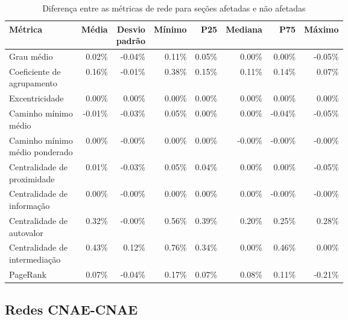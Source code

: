 \begin{table}[htb]
\centering
\caption{Diferença entre as métricas de rede para seções afetadas e não afetadas}
\label{tab:metricas-redes-pandemia:diferenca-afetadas-por-secao}
\begin{tabular}{l|rrrrrrr}
\toprule
Métrica & Média & \shortstack{Desvio\\padrão} & Mínimo & P25 & Mediana & P75 & Máximo \\
\midrule
Grau médio                     &  0.02\% & -0.04\% & 0.11\% & 0.05\% &  0.00\% &  0.00\% & -0.05\% \\ \hline
\shortstack[l]{Coeficiente de\\agrupamento}     &  0.16\% & -0.01\% & 0.38\% & 0.15\% &  0.11\% &  0.14\% &  0.07\% \\ \hline
Excentricidade                 &  0.00\% &  0.00\% & 0.00\% & 0.00\% &  0.00\% &  0.00\% &  0.00\% \\ \hline
\shortstack[l]{Caminho mínimo\\médio}           & -0.01\% & -0.03\% & 0.05\% & 0.00\% &  0.00\% & -0.04\% & -0.05\% \\ \hline
\shortstack[l]{Caminho mínimo\\médio ponderado} &  0.00\% & -0.00\% & 0.00\% & 0.00\% & -0.00\% & -0.00\% & -0.00\% \\ \hline
\shortstack[l]{Centralidade de\\proximidade}    &  0.01\% & -0.03\% & 0.05\% & 0.04\% &  0.00\% &  0.00\% & -0.05\% \\ \hline
\shortstack[l]{Centralidade de\\informação}     &  0.00\% & -0.00\% & 0.00\% & 0.00\% &  0.00\% & -0.00\% & -0.00\% \\ \hline
\shortstack[l]{Centralidade de\\autovalor}      &  0.32\% & -0.00\% & 0.56\% & 0.39\% &  0.20\% &  0.25\% &  0.28\% \\ \hline
\shortstack[l]{Centralidade de\\intermediação}  &  0.43\% &  0.12\% & 0.76\% & 0.34\% &  0.00\% &  0.46\% &  0.00\% \\ \hline
PageRank                       &  0.07\% & -0.04\% & 0.17\% & 0.07\% &  0.08\% &  0.11\% & -0.21\% \\
\bottomrule
\end{tabular}
\fdadospesquisa
\end{table}

\subsection{Redes CNAE-CNAE}
\label{section:alteracoes-topologicas:cnae}

